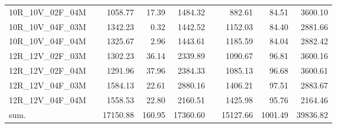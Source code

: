 \begin{tabular}{llrrrlrrr}
10R\_10V\_02F\_04M & \hspace{0.1cm} & 1058.77 & 17.39 & 1484.32 & \hspace{0.2cm} & 882.61 & 84.51 & 3600.10\\
10R\_10V\_04F\_03M & \hspace{0.1cm} & 1342.23 & 0.32 & 1442.52 & \hspace{0.2cm} & 1152.03 & 84.40 & 2881.66\\
10R\_10V\_04F\_04M & \hspace{0.1cm} & 1325.67 & 2.96 & 1443.61 & \hspace{0.2cm} & 1185.59 & 84.04 & 2882.42\\
\addlinespace
12R\_12V\_02F\_03M & \hspace{0.1cm} & 1302.23 & 36.14 & 2339.89 & \hspace{0.2cm} & 1090.67 & 96.81 & 3600.16\\
12R\_12V\_02F\_04M & \hspace{0.1cm} & 1291.96 & 37.96 & 2384.33 & \hspace{0.2cm} & 1085.13 & 96.68 & 3600.61\\
12R\_12V\_04F\_03M & \hspace{0.1cm} & 1584.13 & 22.61 & 2880.16 & \hspace{0.2cm} & 1406.21 & 97.51 & 2883.67\\
12R\_12V\_04F\_04M & \hspace{0.1cm} & 1558.53 & 22.80 & 2160.51 & \hspace{0.2cm} & 1425.98 & 95.76 & 2164.46\\
\addlinespace
sum. & \hspace{0.1cm} & 17150.88 & 160.95 & 17360.60 & \hspace{0.2cm} & 15127.66 & 1001.49 & 39836.82\\
\bottomrule
\end{tabular}
